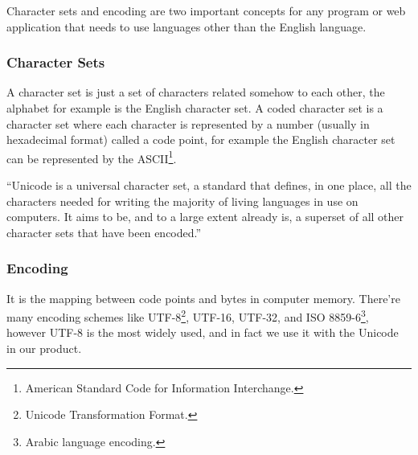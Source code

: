 Character sets and encoding are two important concepts for any program or web application that needs to use languages other than the English language.

\subsubsection{Character Sets}
	A character set is just a set of characters related somehow to each other, the alphabet for example is the English character set.
	A coded character set is a character set where each character is represented by a number (usually in hexadecimal format) called a code point\cite{char_enc}, for example the English character set can be represented by the ASCII\footnote{American Standard Code for Information Interchange.}.
	
	``Unicode is a universal character set, a standard that defines, in one place, all the characters needed for writing the majority of living languages in use on computers. It aims to be, and to a large extent already is, a superset of all other character sets that have been encoded.''\cite{char_enc}
	
\subsubsection{Encoding}
	It is the mapping between code points and bytes in computer memory. There're many encoding schemes like UTF-8\footnote{Unicode Transformation Format.}, UTF-16, UTF-32, and ISO 8859-6\footnote{Arabic language encoding.}, however UTF-8 is the most widely used, and in fact we use it with the Unicode in our product.